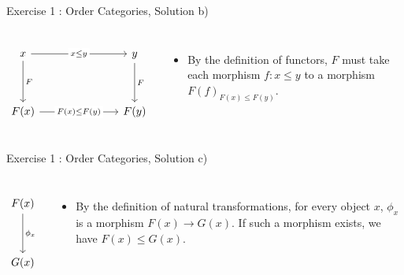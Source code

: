 \begin{frame}[fragile]{Exercise 1 : Order Categories, Solution b)}
	\begin{columns}
		\[\begin{tikzcd}
			x &&& y \\
			\\
			{F(x)} &&& {F(y)}
			\arrow["{{x \leq y}}"{description}, from=1-1, to=1-4]
			\arrow["F", from=1-1, to=3-1]
			\arrow["F", from=1-4, to=3-4]
			\arrow["{{F(x) \leq F(y)}}"{description}, from=3-1, to=3-4]
		\end{tikzcd}\]
		\begin{itemize}
			\item By the definition of functors, $F$ must take each morphism $f : x \leq y$ to a morphism $F(f)_{F(x) \leq F(y)}$.
		\end{itemize} 
	\end{columns} 
\end{frame}
\begin{frame}[fragile]{Exercise 1 : Order Categories, Solution c)}
	\begin{columns}
		\column{0.3\textwidth}
		\[\begin{tikzcd}
			F(x)\\
			\\
			{G(x)}
			\arrow["\phi_x", from=1-1, to=3-1]
		\end{tikzcd}\]
		\column{0.7\textwidth}
		\begin{itemize}
			\item By the definition of natural transformations, for every object $x$, $\phi_x$ is a morphism $F(x) \to G(x)$. If such a morphism exists, we have $F(x) \leq G(x)$.
		\end{itemize} 
	\end{columns} 
\end{frame}